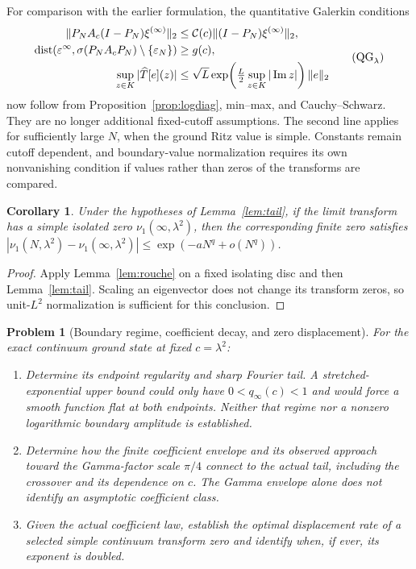 \documentclass[11pt,a4paper]{article}
\newtheorem{corollary}{Corollary}
\newtheorem{problem}{Problem}
\begin{document}
For comparison with the earlier formulation, the quantitative Galerkin
conditions
\begin{equation*}\label{eq:qgalerkin}
\begin{aligned}
 \|P_NA_c(I-P_N)\xi^{(\infty)}\|_2
   &\le \mathcal C(c)\|(I-P_N)\xi^{(\infty)}\|_2,\\
 \operatorname{dist}\!\left(\varepsilon^\infty,
    \sigma(P_NA_cP_N)\setminus\{\varepsilon_N\}\right)&\ge g(c),\\
 \sup_{z\in K}|\widehat T[e](z)|
   &\le\sqrt L\exp\!\left(\tfrac L2\sup_{z\in K}|\operatorname{Im}z|\right)\|e\|_2
\end{aligned}
\tag{$\mathrm{QG}_\lambda$}
\end{equation*}
now follow from Proposition~\ref{prop:logdiag}, min--max, and
Cauchy--Schwarz. They are no longer additional fixed-cutoff assumptions.
The second line applies for sufficiently large $N$, when the ground Ritz
value is simple. Constants remain cutoff dependent, and boundary-value
normalization requires its own nonvanishing condition if values rather than
zeros of the transforms are compared.

\begin{corollary}\label{cor:single}
Under the hypotheses of Lemma~\ref{lem:tail}, if the limit transform has a
simple isolated zero $\nu_1(\infty,\lambda^2)$, then the corresponding finite
zero satisfies
$|\nu_1(N,\lambda^2)-\nu_1(\infty,\lambda^2)|
\le\exp(-aN^q+o(N^q))$.
\end{corollary}
\begin{proof}
Apply Lemma~\ref{lem:rouche} on a fixed isolating disc and then
Lemma~\ref{lem:tail}. Scaling an eigenvector does not change its transform
zeros, so unit-$L^2$ normalization is sufficient for this conclusion.
\end{proof}



\begin{problem}[Boundary regime, coefficient decay, and zero displacement]
\label{prob:decay}
For the exact continuum ground state at fixed $c=\lambda^2$:
\begin{enumerate}
\item[(i)] Determine its endpoint regularity and sharp Fourier tail.
  A stretched-exponential upper bound could only have $0<q_\infty(c)<1$
  and would force a smooth function flat at both endpoints. Neither that
  regime nor a nonzero logarithmic boundary amplitude is established.
\item[(ii)] Determine how the finite coefficient envelope and its observed
  approach toward the Gamma-factor scale $\pi/4$ connect to the actual tail,
  including the crossover and its dependence on $c$. The Gamma envelope
  alone does not identify an asymptotic coefficient class.
\item[(iii)] Given the actual coefficient law, establish the optimal
  displacement rate of a selected simple continuum transform zero and
  identify when, if ever, its exponent is doubled.
\end{enumerate}
\end{problem}
\end{document}
